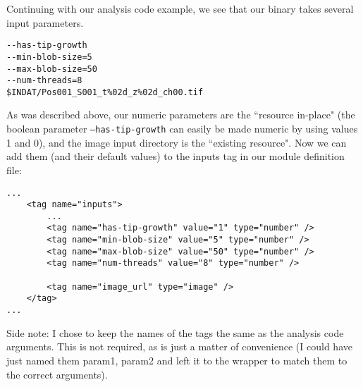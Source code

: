
Continuing with our analysis code example, we see that our binary takes several input parameters.
\begin{verbatim}
--has-tip-growth 
--min-blob-size=5 
--max-blob-size=50 
--num-threads=8 
$INDAT/Pos001_S001_t%02d_z%02d_ch00.tif
\end{verbatim}


As was described above, our numeric parameters are the ``resource in-place" (the boolean parameter \texttt{--has-tip-growth} can easily be made numeric by using values 1 and 0), and the image input directory is the ``existing resource".
Now we can add them (and their default values) to the inputs tag in our module definition file:
\begin{verbatim}
...
    <tag name="inputs">
        ...
        <tag name="has-tip-growth" value="1" type="number" />
        <tag name="min-blob-size" value="5" type="number" />
        <tag name="max-blob-size" value="50" type="number" />
        <tag name="num-threads" value="8" type="number" />
        
        <tag name="image_url" type="image" />
    </tag>
...
\end{verbatim}

Side note: I chose to keep the names of the tags the same as the analysis code arguments. This is not required, as is just a matter of convenience (I could have just named them param1, param2 and left it to the wrapper to match them to the correct arguments).
%
%
%
%
